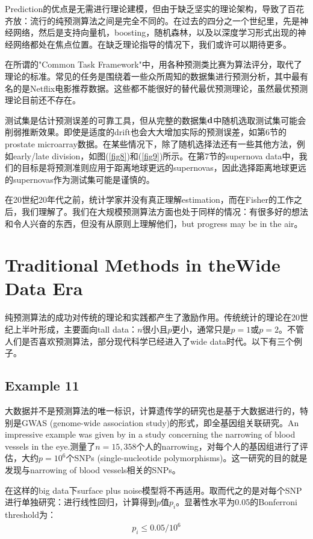 \documentclass[lang=cn,11pt,a4paper,cite=authoryear]{elegantpaper}
\begin{document}
Prediction的优点是无需进行理论建模，但由于缺乏坚实的理论架构，导致了百花齐放：流行的纯预测算法之间是完全不同的。在过去的四分之一个世纪里，先是神经网络，然后是支持向量机，boosting，随机森林，以及以深度学习形式出现的神经网络都处在焦点位置。在缺乏理论指导的情况下，我们或许可以期待更多。

在所谓的"Common Task Framework"中，用各种预测类比赛为算法评分，取代了理论的标准。常见的任务是围绕着一些众所周知的数据集进行预测分析，其中最有名的是Netflix电影推荐数据。这些都不能很好的替代最优预测理论，虽然最优预测理论目前还不存在。

测试集是估计预测误差的可靠工具，但从完整的数据集$\bold{d}$中随机选取测试集可能会削弱推断效果。即使是适度的drift也会大大增加实际的预测误差，如第6节的prostate microarray数据。在某些情况下，除了随机选择法还有一些其他方法，例如early/late division，如图(\ref{fig8})和(\ref{fig9})所示。在第7节的supernova data中，我们的目标是将预测准则应用于距离地球更远的supernovas，因此选择距离地球更远的supernovas作为测试集可能是谨慎的。

在20世纪20年代之前，统计学家并没有真正理解estimation，而在Fisher的工作之后，我们理解了。我们在大规模预测算法方面也处于同样的情况：有很多好的想法和令人兴奋的东西，但没有从原则上理解他们，but progress may be in the air。

\section{Traditional Methods in theWide Data Era}

纯预测算法的成功对传统的理论和实践都产生了激励作用。传统统计的理论在20世纪上半叶形成，主要面向tall data：$n$很小且$p$更小，通常只是$p=1$或$p=2$。不管人们是否喜欢预测算法，部分现代科学已经进入了wide data时代。以下有三个例子。

\subsection{Example 11}

大数据并不是预测算法的唯一标识，计算遗传学的研究也是基于大数据进行的，特别是GWAS (genome-wide association study)的形式，即全基因组关联研究。An impressive example was given by \cite{ikram2010four} in a study concerning the narrowing of blood vessels in the eye.测量了$n=15,358$个人的narrowing，对每个人的基因组进行了评估，大约$p=10^6$个SNPs (single-nucleotide polymorphisms)。这一研究的目的就是发现与narrowing of blood vessels相关的SNPs。

在这样的big data下surface plus noise模型将不再适用。取而代之的是对每个SNP进行单独研究：进行线性回归，计算得到$p$值$p_i$。显著性水平为0.05的Bonferroni threshold为：
\begin{align}
\label{threshold}
	p_i \leq 0.05/10^6
\end{align}
\end{document}
